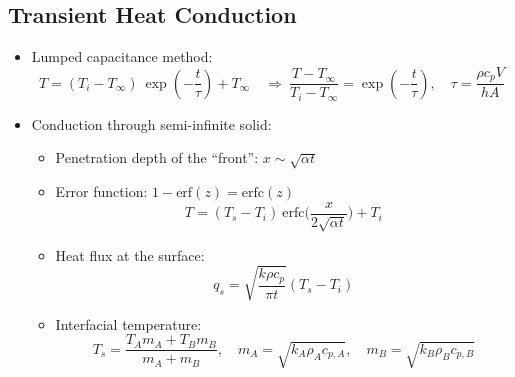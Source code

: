 \documentclass[11pt,a4paper]{article}
\begin{document}
\subsection{Transient Heat Conduction}
\begin{itemize}
    \item Lumped capacitance method: 
    \[
        T =(T_{i}-T_{\infty}) \ \exp(-\frac{t}{\tau})+T_{\infty} \quad \Rightarrow \ \frac{T-T_{\infty}}{T_{i}-T_{\infty}}=\exp(-\frac{t}{\tau}), \quad \tau=\frac{\rho c_{p} V}{hA}
    \] 
	
    \item Conduction through semi-infinite solid:
	\begin{itemize}
            \item Penetration depth of the “front”: $x  \sim  \sqrt{\alpha t}$
            
            \item Error function: $1-\mathrm{erf}(z)=\mathrm{erfc}(z)$
            \[
                T = (T_{s}-T_{i}) \ \mathrm{erfc}\bigg(\frac{x}{2\sqrt{\alpha t}}\bigg)+T_{i}
            \]
            
            \item Heat flux at the surface:
            \[
                q_{s} = \sqrt{\frac{k \rho c_{p}}{\pi t}}(T_{s}-T_{i})
            \]
            
            \item Interfacial temperature:
            \[
                T_{s}=\frac{T_{A}m_{A}+T_{B}m_{B}}{m_{A}+m_{B}}, \quad m_{A} = \sqrt{k_{A}\rho_{A}c_{p,A}}, \quad m_{B} = \sqrt{k_{B}\rho_{B}c_{p,B}}
            \]
	\end{itemize}
\end{itemize}
\end{document}
